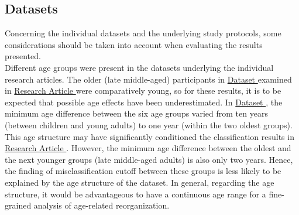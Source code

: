 \subsection{Datasets}
Concerning the individual datasets and the underlying study protocols, some considerations should be taken into account when evaluating the results presented.\\
Different age groups were present in the datasets underlying the individual research articles. The older (late middle-aged) participants in \hyperref[methods:datasets:I]{Dataset } examined in \hyperref[results:paperI]{Research Article } were comparatively young, so for these results, it is to be expected that possible age effects have been underestimated. In \hyperref[methods:datasets:II]{Dataset }, the minimum age difference between the six age groups varied from ten years (between children and young adults) to one year (within the two oldest groups). This age structure may have significantly conditioned the classification results in \hyperref[results:paperII]{Research Article }. However, the minimum age difference between the oldest and the next younger groups (late middle-aged adults) is also only two years. Hence, the finding of misclassification cutoff between these groups is less likely to be explained by the age structure of the dataset. In general, regarding the age structure, it would be advantageous to have a continuous age range for a fine-grained analysis of age-related reorganization.\\
